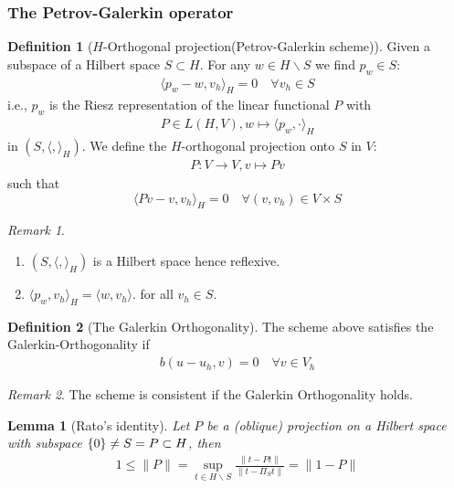 \documentclass[a4paper,12pt,oneside,fleqn]{book}
\newtheorem{lemma}[theorem]{Lemma}
\theoremstyle{definition}
\newtheorem{definition}{Definition}[section]
\theoremstyle{remark}
\newtheorem*{remark}{Remark}
\let\ran\relax
\let\ran\relax
\DeclareMathOperator{\ran}{ran}
\begin{document}
\subsubsection{The Petrov-Galerkin operator}
\begin{definition}[$H$-Orthogonal projection(Petrov-Galerkin scheme)]
	Given a subspace of a Hilbert space $S \subset H$. For any $w \in H \backslash S$ we find $p_w \in S:$
	\begin{align*}
		\langle p_w - w, v_h \rangle_H = 0 \quad \forall v_h \in S
	\end{align*} 
	i.e., $p_w$ is the Riesz representation of the linear functional $P$ with 
	\begin{align*}
		P \in L(H, V), w \mapsto \langle p_w, \cdot  \rangle_H
	\end{align*}
	in $(S, \langle , \rangle_H)$. We define the $H$-orthogonal projection onto $S$ in $V$:
	\begin{align*}
		P: V \rightarrow V, v \mapsto Pv
	\end{align*}
	such that
	\begin{equation}
		\langle Pv - v, v_h \rangle_H = 0 \quad \forall (v, v_h) \in V \times S
	\end{equation}
\end{definition}
\begin{remark}
\quad
\begin{enumerate}
	\item $(S, \langle, \rangle_H)$ is a Hilbert space hence reflexive. 
	\item $\langle p_w, v_h \rangle_H = \langle w, v_h \rangle$. for all $v_h \in S$. 
\end{enumerate}	
\end{remark}

\begin{definition}[The Galerkin Orthogonality]
	The scheme above satisfies the Galerkin-Orthogonality if 
	\begin{align*}
		b(u - u_h, v ) = 0 \quad \forall v \in V_h
	\end{align*} 
\end{definition}
\begin{remark}
The scheme is consistent if the Galerkin Orthogonality holds. 	
\end{remark}


\begin{lemma}[Rato's identity]
	Let $P$ be a (oblique) projection on a Hilbert space with subspace $ \{0 \} \neq S  = \ran P \subset H$, then
	\begin{align*}
		1 \le \|P\| = \sup_{t \in H \backslash S} \frac{\|t - Pt\|}{\|t - \Pi_S t\|} = \| 1 - P\|
	\end{align*}
\end{lemma}
\end{document}
